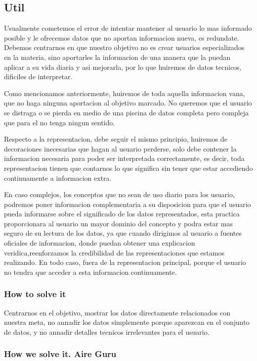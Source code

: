 \subsection{Util}
Usualmente cometemos el error de intentar mantener al usuario lo mas informado posible y le ofrecemos datos que
no aportan informacion nueva, es redundate.
Debemos centrarnos en que nuestro objetivo no es crear usuarios especializados en la materia, sino aportarles la
informacion de una manera que la puedan aplicar a su vida diaria y asi mejorarla, por lo que huiremos de datos
tecnicos, dificiles de interpretar.

Como mencionamos anteriormente, huiremos de toda aquella informacion vana, que no haga ninguna aportacion
al objetivo marcado. No queremos que el usuario se distraga o se pierda en medio de una piscina de datos completa
pero compleja que para el no tenga ningun sentido. 

Respecto a la representacion, debe seguir el mismo principio, huiremos de decoraciones inecesarias que hagan al 
usuario perderse, solo debe contener la informacion necesaria para poder ser interpretada correctamente, es decir,
toda representacion tienen que contarnos lo que significa sin tener que estar accediendo continuamente a informacion
extra.

En caso complejos, los conceptos que no sean de uso diario para los usuario, podremos poner informacion
complementaria a su disposicion para que el usuario pueda informarse sobre el significado de los datos 
representados, esta practica proporcionara al usuario un mayor dominio del concepto y podra estar mas
seguro de su lectura de los datos, ya que cuando dirigimos al usuario a fuentes oficiales de informacion, donde puedan 
obtener una explicacion veridica,reenforzamos la credibilidad de las representaciones que estamos realizando. En todo caso, 
fuera de la representacion principal, porque el usuario no tendra que acceder a esta informacion continuamente.

\subsubsection{How to solve it} 
Centrarnos en el objetivo, mostrar los datos directamente relacionados con nuestra meta, no annadir los datos 
simplemente porque aparezcan en el conjunto de datos, y no annadir detalles tecnicos irrelevantes para el usuario.


\subsubsection{How we solve it. Aire Guru} 

